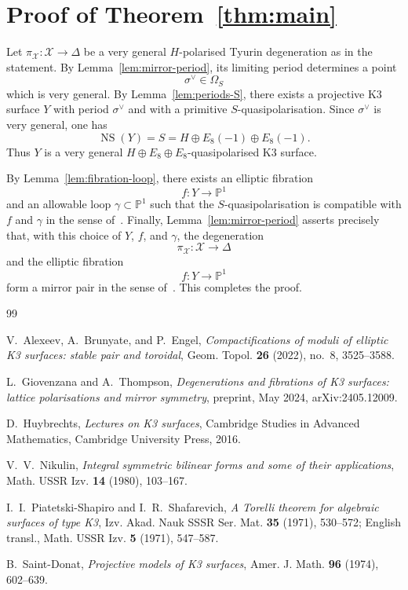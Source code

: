 \documentclass[11pt]{article}
\theoremstyle{remark}
\numberwithin{equation}{section}
\begin{document}
\section{Proof of Theorem~\ref{thm:main}}

Let \(\pi_{\mathcal X}\colon \mathcal X\to \Delta\) be a very general \(H\)-polarised Tyurin degeneration as in the statement. By Lemma~\ref{lem:mirror-period}, its limiting period determines a point
\[
\sigma^\vee\in \Omega_S
\]
which is very general. By Lemma~\ref{lem:periods-S}, there exists a projective K3 surface \(Y\) with period \(\sigma^\vee\) and with a primitive \(S\)-quasipolarisation. Since \(\sigma^\vee\) is very general, one has
\[
\operatorname{NS}(Y)=S=H\oplus E_8(-1)\oplus E_8(-1).
\]
Thus \(Y\) is a very general \(H\oplus E_8\oplus E_8\)-quasipolarised K3 surface.

By Lemma~\ref{lem:fibration-loop}, there exists an elliptic fibration
\[
f\colon Y\to \mathbb P^1
\]
and an allowable loop \(\gamma\subset \mathbb P^1\) such that the \(S\)-quasipolarisation is compatible with \(f\) and \(\gamma\) in the sense of~\cite[Definition~4.21]{dfk3slpms}. Finally, Lemma~\ref{lem:mirror-period} asserts precisely that, with this choice of \(Y\), \(f\), and \(\gamma\), the degeneration
\[
\pi_{\mathcal X}\colon \mathcal X\to \Delta
\]
and the elliptic fibration
\[
f\colon Y\to \mathbb P^1
\]
form a mirror pair in the sense of~\cite[Definition~5.1]{dfk3slpms}. This completes the proof.

\begin{thebibliography}{99}

V.~Alexeev, A.~Brunyate, and P.~Engel,
\emph{Compactifications of moduli of elliptic {K3} surfaces: stable pair and toroidal},
Geom. Topol. \textbf{26} (2022), no.~8, 3525--3588.

L.~Giovenzana and A.~Thompson,
\emph{Degenerations and fibrations of {K3} surfaces: lattice polarisations and mirror symmetry},
preprint, May 2024, arXiv:2405.12009.

D.~Huybrechts,
\emph{Lectures on {K3} surfaces},
Cambridge Studies in Advanced Mathematics, Cambridge University Press, 2016.

V.~V.~Nikulin,
\emph{Integral symmetric bilinear forms and some of their applications},
Math. USSR Izv. \textbf{14} (1980), 103--167.

I.~I.~Piatetski-Shapiro and I.~R.~Shafarevich,
\emph{A Torelli theorem for algebraic surfaces of type {K3}},
Izv. Akad. Nauk SSSR Ser. Mat. \textbf{35} (1971), 530--572;
English transl., Math. USSR Izv. \textbf{5} (1971), 547--587.

B.~Saint-Donat,
\emph{Projective models of {K3} surfaces},
Amer. J. Math. \textbf{96} (1974), 602--639.

\end{thebibliography}
\end{document}
